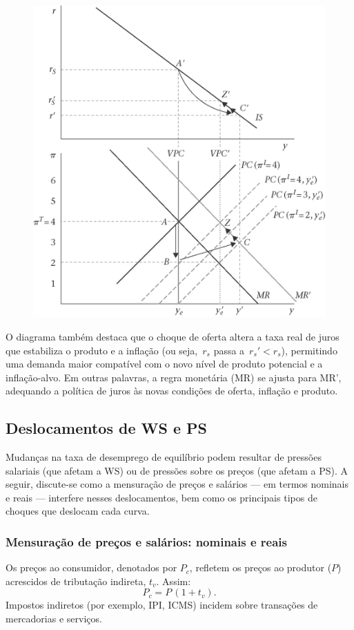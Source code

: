 \documentclass[a4paper,12pt]{article}[abntex2]
\begin{document}
\begin{figure}[H]
    \centering
    \includegraphics[width=0.7\linewidth]{Imagens/a14i4.png}
\end{figure}

O diagrama também destaca que o choque de oferta altera a taxa real de juros que estabiliza o produto e a inflação (ou seja, \(\,r_s\) passa a \(\,r_s' < r_s\)), permitindo uma demanda maior compatível com o novo nível de produto potencial e a inflação-alvo. Em outras palavras, a regra monetária (MR) se ajusta para MR', adequando a política de juros às novas condições de oferta, inflação e produto.

\subsection{\textbf{Deslocamentos de WS e PS}}

Mudanças na taxa de desemprego de equilíbrio podem resultar de pressões salariais (que afetam a WS) ou de pressões sobre os preços (que afetam a PS). A seguir, discute-se como a mensuração de preços e salários — em termos nominais e reais — interfere nesses deslocamentos, bem como os principais tipos de choques que deslocam cada curva.

\subsubsection{\textbf{Mensuração de preços e salários: nominais e reais}}

Os preços ao consumidor, denotados por \(P_c\), refletem os preços ao produtor (\(P\)) acrescidos de tributação indireta, \(t_v\). Assim:
\[
P_c = P \,(1 + t_v).
\]
Impostos indiretos (por exemplo, IPI, ICMS) incidem sobre transações de mercadorias e serviços.
\end{document}
